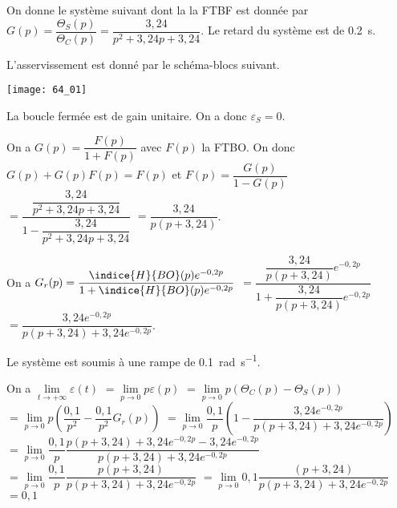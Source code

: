 \normaltrue \difficilefalse \tdifficilefalse
\correctionfalse

\setcounter{question}{0}%

\ifcorrection
\else
{}
\fi


\ifprof
\else
On donne le système suivant dont la la FTBF est donnée par 
$G(p)=\dfrac{\Theta_S(p)}{\Theta_C(p)}=\dfrac{3,24}{p^2+3,24 p+3,24}$. Le retard du système est de \SI{0,2}{s}.

L'asservissement est donné par le schéma-blocs suivant.

\begin{marginfigure}
\texttt{[image: 64\_01]}
\end{marginfigure}

\fi

 
\ifprof

La boucle fermée est de gain unitaire. On a donc $\varepsilon_S = 0$.
\else 
\fi

\ifprof

On a $G(p)=\dfrac{F(p)}{1+F(p)}$ avec $F(p)$ la FTBO. On donc $G(p)+G(p)F(p)=F(p)$ et
 $F(p)=\dfrac{G(p)}{1-G(p)} $
 $ = \dfrac{\dfrac{3,24}{p^2+3,24 p+3,24}}{1-\dfrac{3,24}{p^2+3,24 p+3,24}} $
  $ = \dfrac{3,24}{p\left(p+3,24\right)} $. 

\else 
\fi
 
\ifprof

On a $G_r(p)=\dfrac{\indice{H}{BO}(p)e^{-0,2 p}}{1+\indice{H}{BO}(p)e^{-0,2 p}}$ 
$=\dfrac{\dfrac{3,24}{p\left(p+3,24\right)}e^{-0,2 p}}{1+\dfrac{3,24}{p\left(p+3,24\right)}e^{-0,2 p}}$
$=\dfrac{3,24e^{-0,2 p}}{p\left(p+3,24\right)+3,24e^{-0,2 p}}$.
\else 
\fi

Le système est soumis à une rampe de \SI{0,1}{rad.s^{-1}}.
 
\ifprof

On a $\lim\limits_{t\to +\infty} \varepsilon(t) $
$= \lim\limits_{p\to 0} p\varepsilon(p) $
$= \lim\limits_{p\to 0} p\left( \Theta_C(p) - \Theta_S(p) \right) $
$= \lim\limits_{p\to 0} p\left( \dfrac{0,1}{p^2}-\dfrac{0,1}{p^2} G_r(p) \right) $
$= \lim\limits_{p\to 0}  \dfrac{0,1}{p}\left(1-\dfrac{3,24e^{-0,2 p}}{p\left(p+3,24\right)+3,24e^{-0,2 p}} \right) $
$= \lim\limits_{p\to 0}  \dfrac{0,1}{p}\dfrac{p\left(p+3,24\right)+3,24e^{-0,2 p}-3,24e^{-0,2 p}}{p\left(p+3,24\right)+3,24e^{-0,2 p}}  $
$= \lim\limits_{p\to 0}  \dfrac{0,1}{p}\dfrac{p\left(p+3,24\right)}{p\left(p+3,24\right)+3,24e^{-0,2 p}}  $
$= \lim\limits_{p\to 0}  0,1\dfrac{\left(p+3,24\right)}{p\left(p+3,24\right)+3,24e^{-0,2 p}}  $
$=  0,1 $
\else 
\fi
 
